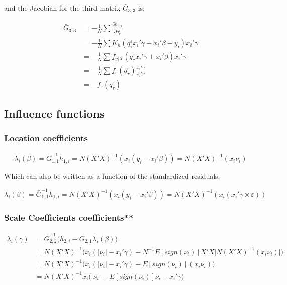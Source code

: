 \documentclass[
  authoryear,
  preprint,
  1p]{elsarticle}
\begin{document}
and the Jacobian for the third matrix \(\bar G_{3,3}\) is:

\[\begin{aligned}
\bar G_{3,3} &= -\frac{1}{N} \sum \frac{\partial h_{3,i}}{\partial q^\varepsilon_\tau} \\
 &= -\frac{1}{N} \sum K_h(q^\varepsilon_\tau x_i'\gamma +x_i'\beta - y_i ) x_i'\gamma \\
 &= -\frac{1}{N} \sum f_{y|X}(q^\varepsilon_\tau x_i'\gamma +x_i'\beta) x_i'\gamma \\
 &= -\frac{1}{N} \sum f_{\varepsilon}(q^\varepsilon_\tau) \frac{x_i'\gamma}{ x_i'\gamma} \\
 &= - f_{\varepsilon}(q^\varepsilon_\tau) 
\end{aligned}
\]

\hypertarget{influence-functions}{%
\subsection{Influence functions}\label{influence-functions}}

\hypertarget{location-coefficients}{%
\subsubsection{Location coefficients}\label{location-coefficients}}

\[\lambda_i(\beta) = \bar G^{-1}_{1,1} h_{1,i} = N (X'X)^{-1}(x_i (y_i-x_i'\beta)) = N (X'X)^{-1}(x_i \nu_i)
\]

Which can also be written as a function of the standardized residuals:

\[\lambda_i(\beta) = \bar G^{-1}_{1,1} h_{1,i} = N (X'X)^{-1}(x_i (y_i-x_i'\beta)) = N (X'X)^{-1}(x_i ( x_i'\gamma \times \varepsilon))
\]

\hypertarget{scale-coefficients-coefficients}{%
\subsubsection{Scale Coefficients
coefficients**}\label{scale-coefficients-coefficients}}

\[\begin{aligned}
\lambda_i(\gamma)&=\bar G_{2,2}^{-1}\Big(h_{2,i}-\bar G_{2,1} \lambda_i(\beta)\Big) \\
&=N (X'X)^{-1} \Big(x_i(|\nu_i|-x_i' \gamma) 
- N^{-1} E[sign(\nu_i)] X'X \big[ N (X'X)^{-1}(x_i \nu_i) \big] \Big) \\
&=N (X'X)^{-1} \Big(x_i(|\nu_i|-x_i' \gamma) - E[sign(\nu_i)] (x_i \nu_i)  \Big) \\
&=N (X'X)^{-1} x_i \Big( |\nu_i| - E[sign(\nu_i)] \nu_i -x_i' \gamma \Big) 
\end{aligned}
\]
\end{document}
